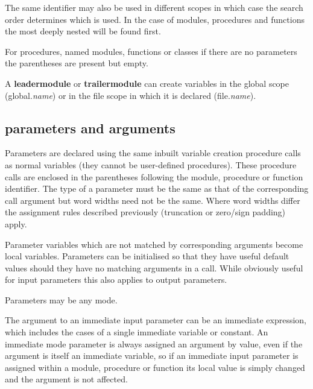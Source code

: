             The same identifier may also be used in different scopes in which
            case the search order determines which is used. In the case
            of modules, procedures and functions the most deeply nested will
            be found first.

            For procedures, named modules, functions or classes if there are no
            parameters the parentheses are present but empty.
            
            A {\bf leadermodule} or {\bf trailermodule} can create variables in
            the global scope (global.{\em name}) or in the file scope in which
            it is declared (file.{\em name}).

        \subsection{parameters and arguments}\label{sec:callparams}
        
            Parameters are declared using the same inbuilt variable creation
            procedure calls as normal variables (they cannot be user-defined
            procedures). These procedure calls are enclosed in the parentheses
            following the module, procedure or function identifier. The type of a
            parameter must be the same as that of the corresponding call argument
            but word widths need not be the same. Where word widths differ the
            assignment rules described previously (truncation or zero/sign padding)
            apply.

            Parameter variables which are not matched by corresponding
            arguments become local variables. Parameters can be initialised so
            that they have useful default values should they have no matching
            arguments in a call. While obviously useful for input parameters
            this also applies to output parameters.

            Parameters may be any mode.

            The argument to an immediate input parameter can be
            an immediate expression, which includes the cases of a single
            immediate variable or constant. An immediate mode parameter is always
            assigned an argument by value, even if the argument is itself
            an immediate variable, so if an immediate input parameter
            is assigned within a module, procedure or function its local value
            is simply changed and the argument is not affected.

